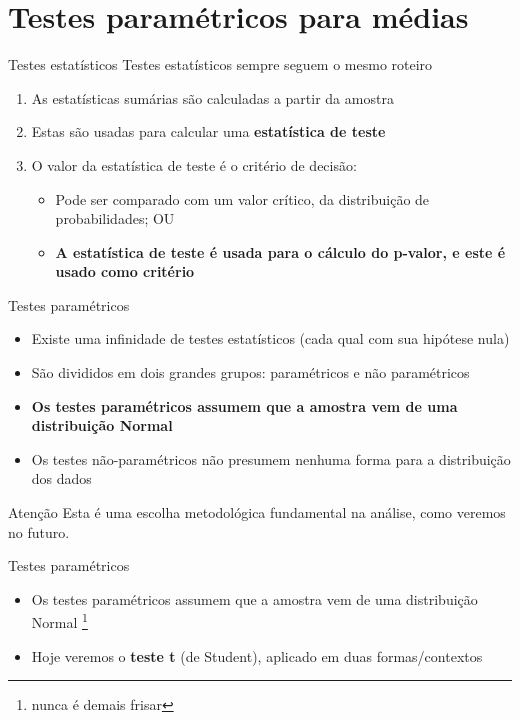 \documentclass{beamer}
\begin{document}
\section{Testes paramétricos para médias}

\begin{frame}{Testes estatísticos}
Testes estatísticos sempre seguem o mesmo roteiro
  \begin{enumerate}
  \item As estatísticas sumárias são calculadas a partir da amostra
  \item Estas são usadas para calcular uma {\bf estatística de teste}
  \item O valor da estatística de teste é o critério de decisão:
    \begin{itemize}
    \item Pode ser comparado com um valor crítico, da distribuição de probabilidades; OU
    \item {\bf A estatística de teste é usada para o cálculo do p-valor, e este é usado como critério}
    \end{itemize}
  \end{enumerate}
\end{frame}

\begin{frame}{Testes paramétricos}
  \begin{itemize}
  \item Existe uma infinidade de testes estatísticos (cada qual com sua hipótese nula)
  \item São divididos em dois grandes grupos: paramétricos e não paramétricos
  \item {\bf Os testes paramétricos assumem que a amostra vem de uma \alert{distribuição Normal}}
  \item Os testes não-paramétricos não presumem nenhuma forma para a distribuição dos dados
  \end{itemize}
  \begin{block}{Atenção}
    Esta é uma escolha metodológica fundamental na análise, como veremos no futuro.
  \end{block}
\end{frame}

\begin{frame}{Testes paramétricos}
  \begin{itemize}
  \item Os testes paramétricos assumem que a amostra vem de uma \alert{distribuição Normal} \footnote{nunca é demais frisar}
  \item Hoje veremos o {\bf teste t} (de Student), aplicado em duas formas/contextos
  \end{itemize}
\end{frame}
\end{document}
